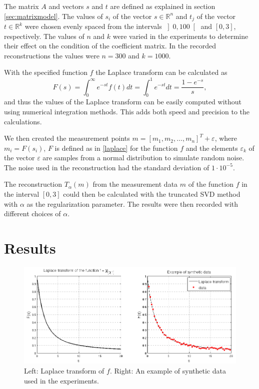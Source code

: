 \documentclass[12pt,a4]{article}
\newcommand{\R}{{\mathbb R}}
\newcommand{\eps}{\varepsilon}
\begin{document}
The matrix $A$ and vectors $s$ and $t$ are defined as explained in section \ref{sec:matrixmodel}. The values of $s_i$ of the vector $s \in \R^n$ and $t_j$ of the vector $t \in \R^k$ were chosen evenly spaced from the intervals $\left] 0, 100 \right[$ and $\left[ 0,3 \right]$, respectively. The values of $n$ and $k$ were varied in the experiments to determine their effect on the condition of the coefficient matrix. In the recorded reconstructions the values were $n = 300$ and $k = 1000$.

With the specified function $f$ the Laplace transform can be calculated as
\begin{equation}
F(s) = \int_0^{\infty} e^{-st} f(t) dt
     = \int_0^1 e^{-st} dt
     = \frac{1 - e^{-s}}{s},
\end{equation}
and thus the values of the Laplace transform can be easily computed without using numerical integration methods. This adds both speed and precision to the calculations.

We then created the measurement points $m = [m_1, m_2, \ldots, m_n]^T + \eps$, where $m_i = F(s_i)$, $F$ is defined as in \eqref{laplace} for the function $f$ and the elements $\eps_k$ of the vector $\eps$ are samples from a normal distribution to simulate random noise. The noise used in the reconstruction had the standard deviation of $1 \cdot 10^{-5}$.

The reconstruction $T_\alpha(m)$ from the measurement data $m$ of the function $f$ in the interval $\left[0,3\right]$ could then be calculated with the truncated SVD method with $\alpha$ as the regularization parameter. The results were then recorded with different choices of $\alpha$.



\section{Results}\label{sec:results}

\begin{figure}[t]
\begin{center}
\includegraphics[scale=.5]{img/laplace_data.png}
\end{center}
\caption{Left: Laplace transform of $f$. Right: An example of synthetic data used in the experiments.}
\label{fig:laplace}
\end{figure}
\end{document}
